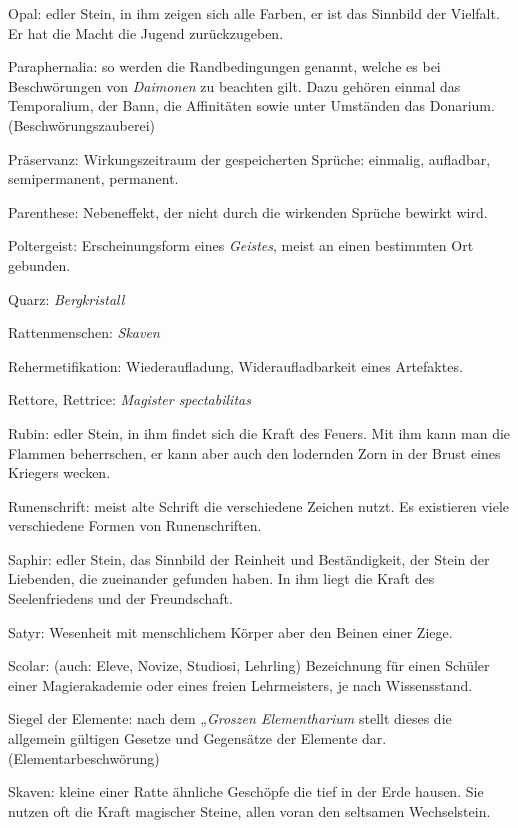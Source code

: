 \documentclass[a5paper,8pt]{book}
\begin{document}
\begin{small}
\begin{description}
 \item Opal: edler Stein, in ihm zeigen sich alle Farben, er ist das Sinnbild der Vielfalt. Er hat die Macht die Jugend zurückzugeben.
 \item Paraphernalia: so werden die Randbedingungen ge­nannt, welche es bei Beschwörungen von \textit{Daimonen} zu beachten gilt. Dazu gehören einmal das \textit{}Temporalium, der Bann, die \textit{}Affinitäten sowie unter Um­ständen das \textit{}Donarium. (\textit{}Beschwörungszauberei)
 \item Präservanz: Wirkungszeitraum der gespeicherten Sprüche: einmalig, aufladbar, semipermanent, permanent.
 \item Parenthese: Nebeneffekt, der nicht durch die wirkenden Sprüche bewirkt wird.
 \item Poltergeist: Erscheinungsform eines \textit{Geistes}, meist an einen bestimmten Ort gebunden.
 \item Quarz: \textit{Bergkristall}
 \item Rattenmenschen: \textit{Skaven}
 \item Rehermetifikation: Wiederaufladung, Wideraufladbarkeit eines Artefaktes.
 \item Rettore, Rettrice: \textit{Magister spectabilitas}
 \item Rubin: edler Stein, in ihm findet sich die Kraft des Feuers. Mit ihm kann man die Flammen beherrschen, er kann aber auch den lodernden Zorn in der Brust eines Kriegers wecken.
 \item Runenschrift: meist alte Schrift die verschiedene Zeichen nutzt. Es existieren viele verschiedene Formen von Runenschriften.
 \item Saphir: edler Stein, das Sinnbild der Rein­heit und Beständigkeit, der Stein der Liebenden, die zueinander gefunden haben. In ihm liegt die Kraft des Seelenfriedens und der Freundschaft.
 \item Satyr: Wesenheit mit menschlichem Körper aber den Beinen einer Ziege.
 \item Scolar: (auch: Eleve, Novize, Studiosi, Lehrling) Bezeichnung für einen Schüler einer Magierakademie oder eines freien Lehr­meisters, je nach Wissensstand. 
 \item Siegel der Elemente: nach dem „\textit{Groszen Elemen­tharium} stellt dieses die allgemein gültigen Gesetze und Gegensätze der Elemente dar. (\textit{}Elementarbeschwörung)
 \item Skaven: kleine einer Ratte ähnliche Geschöpfe die tief in der Erde hausen. Sie nutzen oft die Kraft magischer Steine, allen voran den seltsamen \textit{}Wechselstein. 

\end{description}
\end{small}
\end{document}
